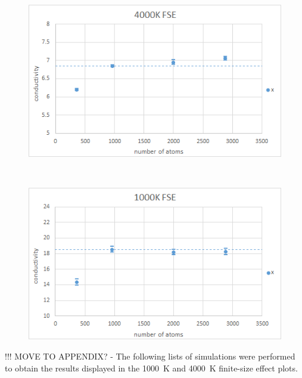 \begin{figure}[hb]
\includegraphics[width=\linewidth]{Figures/gk_fse_4K_draft.png}
\caption[gk fse 4k]{}
\label{fig:gk_fse_4K}
\end{figure}
~
\begin{figure}[h]
\includegraphics[width=\linewidth]{Figures/gk_fse_1K_draft.png}
\caption[gk fse 1k]{}
\label{fig:gk_fse_1K}
\end{figure}


%
\pagebreak
%


!!! MOVE TO APPENDIX? - The following lists of simulations were performed to obtain the results displayed in the 1000~K and 4000~K finite-size effect plots.

